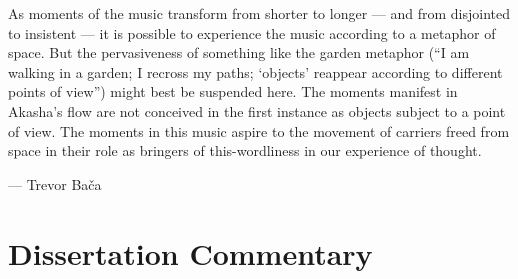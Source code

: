 As moments of the music transform from shorter to longer — and from disjointed to insistent — it is possible to experience the music according to a metaphor of space. But the pervasiveness of something like the garden metaphor (“I am walking in a garden; I recross my paths; `objects’ reappear according to different points of view”) might best be suspended here. The moments manifest in Akasha’s flow are not conceived in the first instance as objects subject to a point of view. The moments in this music aspire to the movement of carriers freed from space in their role as bringers of this-wordliness in our experience of thought.

\phantom{text} \hfill — Trevor Bača

\section{Dissertation Commentary}

